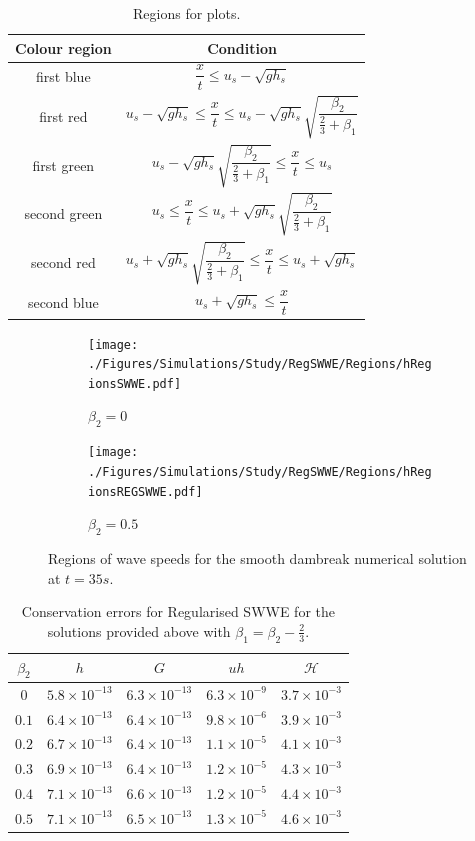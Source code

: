 \documentclass[10pt]{article}
\newcommand\T{\rule{0pt}{5ex }}       %
\begin{document}
\begin{table}
	\centering
	\begin{tabular}{c | c}
		Colour region & Condition \\
		\hline
		first blue & $\dfrac{x}{t} \le u_{s} - \sqrt{g h_{s}} $ \\
		first red & $  u_{s} - \sqrt{g h_{s}} \le \dfrac{x}{t} \le u_s - \sqrt{gh_s} \sqrt{\dfrac{\beta_2}{\frac{2}{3} + \beta_1}}$ \\
		first green & $u_s - \sqrt{gh_s} \sqrt{\dfrac{\beta_2}{\frac{2}{3} + \beta_1}} \le \dfrac{x}{t} \le u_{s}$ \\
		second green & $u_{s} \le \dfrac{x}{t}\le u_s + \sqrt{gh_s} \sqrt{\dfrac{\beta_2}{\frac{2}{3} + \beta_1}}$ \\
		second red & $  u_s + \sqrt{gh_s} \sqrt{\dfrac{\beta_2}{\frac{2}{3} + \beta_1}} \le \dfrac{x}{t} \le  u_{s} + \sqrt{g h_{s}} $ \\
		second blue & $u_{s} +  \sqrt{g h_{s}} \le \dfrac{x}{t} $ 	
	\end{tabular}
	\caption{Regions for plots.  	\label{tab:regions1}  }
\end{table}

\begin{figure}
	\centering
	\begin{subfigure}{0.49\textwidth}
		\centering
		\texttt{[image: ./Figures/Simulations/Study/RegSWWE/Regions/hRegionsSWWE.pdf]}
		\caption{$\beta_2 = 0$}
	\end{subfigure}
	\begin{subfigure}{0.49\textwidth}
		\centering
		\texttt{[image: ./Figures/Simulations/Study/RegSWWE/Regions/hRegionsREGSWWE.pdf]}
		\caption{$\beta_2 = 0.5$}
	\end{subfigure}
	\caption{Regions of wave speeds for the smooth dambreak numerical solution at $t=35s$.}
\end{figure}

\begin{table}
	\centering
	\begin{tabular}{ c | c | c | c | c }
	$\beta_2$ & $h$ & $G$ & $uh$ & $\mathcal{H}$  \\
		\hline
	\T $0$ &	$5.8 \times 10^{-13}$ & $6.3 \times 10^{-13}$  & $6.3 \times 10^{-9}$ &	 $3.7 \times 10^{-3}$ \\
	\T $0.1$ &	$6.4 \times 10^{-13}$ & $6.4 \times 10^{-13}$  & $9.8 \times 10^{-6}$ &	 $3.9 \times 10^{-3}$ \\
	\T $0.2$ &	$6.7 \times 10^{-13}$ & $6.4 \times 10^{-13}$  & $1.1\times 10^{-5}$ &	 $4.1 \times 10^{-3}$ \\
	\T $0.3$ &	$6.9 \times 10^{-13}$ & $6.4 \times 10^{-13}$  & $1.2\times 10^{-5}$ &	 $4.3 \times 10^{-3}$ \\
	\T $0.4$ &	$7.1 \times 10^{-13}$ & $6.6 \times 10^{-13}$  & $1.2\times 10^{-5}$ &	 $4.4 \times 10^{-3}$ \\
	\T $0.5$ &	$7.1 \times 10^{-13}$ & $6.5 \times 10^{-13}$  & $1.3\times 10^{-5}$ &	 $4.6 \times 10^{-3}$ \\
	\end{tabular}
	\caption{Conservation errors for Regularised SWWE for the solutions provided above with $\beta_1 = \beta_2 - \frac{2}{3}$.}
\end{table}
\end{document}
